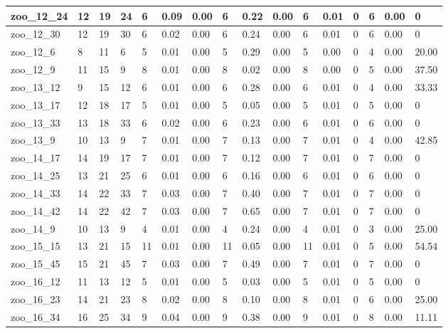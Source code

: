 \begin{landscape}
\begin{longtable}{llllllllllllllll}
zoo\_12\_24 & 12 & 19 & 24 & 6 & 0.09 & 0.00 & 6 & 0.22 & 0.00 & 6 & 0.01 & 0 & 6 & 0.00 & 0 \\ \hline 
zoo\_12\_30 & 12 & 19 & 30 & 6 & 0.02 & 0.00 & 6 & 0.24 & 0.00 & 6 & 0.01 & 0 & 6 & 0.00 & 0 \\ \hline 
zoo\_12\_6 & 8 & 11 & 6 & 5 & 0.01 & 0.00 & 5 & 0.29 & 0.00 & 5 & 0.00 & 0 & 4 & 0.00 & 20.00 \\ \hline 
zoo\_12\_9 & 11 & 15 & 9 & 8 & 0.01 & 0.00 & 8 & 0.02 & 0.00 & 8 & 0.00 & 0 & 5 & 0.00 & 37.50 \\ \hline 
zoo\_13\_12 & 9 & 15 & 12 & 6 & 0.01 & 0.00 & 6 & 0.28 & 0.00 & 6 & 0.01 & 0 & 4 & 0.00 & 33.33 \\ \hline 
zoo\_13\_17 & 12 & 18 & 17 & 5 & 0.01 & 0.00 & 5 & 0.05 & 0.00 & 5 & 0.01 & 0 & 5 & 0.00 & 0 \\ \hline 
zoo\_13\_33 & 13 & 18 & 33 & 6 & 0.02 & 0.00 & 6 & 0.23 & 0.00 & 6 & 0.01 & 0 & 6 & 0.00 & 0 \\ \hline 
zoo\_13\_9 & 10 & 13 & 9 & 7 & 0.01 & 0.00 & 7 & 0.13 & 0.00 & 7 & 0.01 & 0 & 4 & 0.00 & 42.85 \\ \hline 
zoo\_14\_17 & 14 & 19 & 17 & 7 & 0.01 & 0.00 & 7 & 0.12 & 0.00 & 7 & 0.01 & 0 & 7 & 0.00 & 0 \\ \hline 
zoo\_14\_25 & 13 & 21 & 25 & 6 & 0.01 & 0.00 & 6 & 0.16 & 0.00 & 6 & 0.01 & 0 & 6 & 0.00 & 0 \\ \hline 
zoo\_14\_33 & 14 & 22 & 33 & 7 & 0.03 & 0.00 & 7 & 0.40 & 0.00 & 7 & 0.01 & 0 & 7 & 0.00 & 0 \\ \hline 
zoo\_14\_42 & 14 & 22 & 42 & 7 & 0.03 & 0.00 & 7 & 0.65 & 0.00 & 7 & 0.01 & 0 & 7 & 0.00 & 0 \\ \hline 
zoo\_14\_9 & 10 & 13 & 9 & 4 & 0.01 & 0.00 & 4 & 0.24 & 0.00 & 4 & 0.01 & 0 & 3 & 0.00 & 25.00 \\ \hline 
zoo\_15\_15 & 13 & 21 & 15 & 11 & 0.01 & 0.00 & 11 & 0.05 & 0.00 & 11 & 0.01 & 0 & 5 & 0.00 & 54.54 \\ \hline 
zoo\_15\_45 & 15 & 21 & 45 & 7 & 0.03 & 0.00 & 7 & 0.49 & 0.00 & 7 & 0.01 & 0 & 7 & 0.00 & 0 \\ \hline 
zoo\_16\_12 & 11 & 13 & 12 & 5 & 0.01 & 0.00 & 5 & 0.03 & 0.00 & 5 & 0.01 & 0 & 5 & 0.00 & 0 \\ \hline 
zoo\_16\_23 & 14 & 21 & 23 & 8 & 0.02 & 0.00 & 8 & 0.10 & 0.00 & 8 & 0.01 & 0 & 6 & 0.00 & 25.00 \\ \hline 
zoo\_16\_34 & 16 & 25 & 34 & 9 & 0.04 & 0.00 & 9 & 0.38 & 0.00 & 9 & 0.01 & 0 & 8 & 0.00 & 11.11 \\ \hline 

\end{longtable}
\end{landscape}
